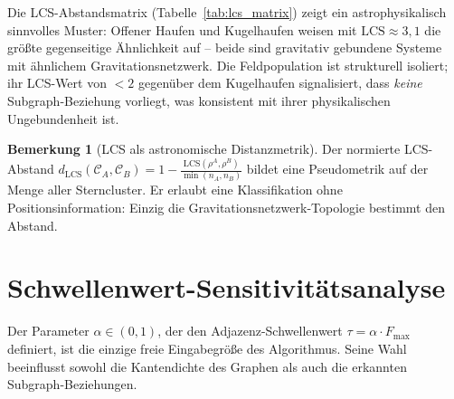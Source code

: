 ﻿\documentclass[a4paper,12pt]{report}
\theoremstyle{definition}
\newtheorem{bemerkung}{Bemerkung}
\begin{document}
Die LCS-Abstandsmatrix (Tabelle~\ref{tab:lcs_matrix}) zeigt ein astrophysikalisch sinnvolles Muster: Offener Haufen und Kugelhaufen weisen mit $\mathrm{LCS} \approx 3{,}1$ die größte gegenseitige Ähnlichkeit auf -- beide sind gravitativ gebundene Systeme mit ähnlichem Gravitationsnetzwerk. Die Feldpopulation ist strukturell isoliert; ihr LCS-Wert von $< 2$ gegenüber dem Kugelhaufen signalisiert, dass \emph{keine} Subgraph-Beziehung vorliegt, was konsistent mit ihrer physikalischen Ungebundenheit ist.

\begin{bemerkung}[LCS als astronomische Distanzmetrik]
Der normierte LCS-Abstand $d_\mathrm{LCS}(\mathcal{C}_A, \mathcal{C}_B) = 1 - \frac{\mathrm{LCS}(\rho^A, \rho^B)}{\min(n_A, n_B)}$ bildet eine Pseudometrik auf der Menge aller Sterncluster. Er erlaubt eine Klassifikation ohne Positionsinformation: Einzig die Gravitationsnetzwerk-Topologie bestimmt den Abstand.
\end{bemerkung}

\section{Schwellenwert-Sensitivitätsanalyse}
\label{sec:empirie_schwelle}

Der Parameter $\alpha \in (0,1)$, der den Adjazenz-Schwellenwert $\tau = \alpha \cdot F_{\max}$ definiert, ist die einzige freie Eingabegröße des Algorithmus. Seine Wahl beeinflusst sowohl die Kantendichte des Graphen als auch die erkannten Subgraph-Beziehungen.
\end{document}
